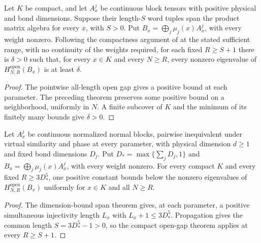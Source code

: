 \begin{lemma}
    \label{thm:compact_block_open_gap}
    \leanok
    Let $K$ be compact, and let $A_x^j$ be continuous block tensors with
    positive physical and bond dimensions. Suppose their length-$S$ word
    tuples span the product matrix algebra for every $x$, with $S>0$.
    Put $B_x=\bigoplus_j\mu_j(x)A_x^j$, with every weight nonzero.
    Following the compactness argument of \cite[Appendix~A]{Schuch2011Phases}
    at the stated sufficient range, with no continuity of the weights required,
    for each fixed $R\geq S+1$ there is $\delta>0$ such that, for every
    $x\in K$ and every $N\geq R$, every nonzero eigenvalue of
    $H^{\mathrm{open}}_{N,R}(B_x)$ is at least $\delta$.
\end{lemma}
\begin{proof}\leanok
    The pointwise all-length open gap gives a positive bound at each
    parameter. The preceding theorem preserves some positive bound on
    a neighborhood, uniformly in $N$. A finite subcover of $K$ and the
    minimum of its finitely many bounds give $\delta>0$.
\end{proof}

\begin{lemma}
    \label{thm:compact_normal_block_open_gap}
    \leanok
    Let $A_x^j$ be continuous normalized normal blocks, pairwise inequivalent
    under virtual similarity and phase at every parameter, with physical
    dimension $d\geq1$ and fixed bond dimensions $D_j$.
    Put $D_* =\max\{\sum_jD_j,1\}$ and
    $B_x=\bigoplus_j\mu_j(x)A_x^j$, with every weight nonzero.
    For every compact $K$ and every fixed $R\geq3D_*^5$, one positive
    constant bounds below the nonzero eigenvalues of
    $H^{\mathrm{open}}_{N,R}(B_x)$ uniformly for $x\in K$ and all $N\geq R$.
\end{lemma}
\begin{proof}\leanok
    The dimension-bound span theorem gives, at each parameter, a positive
    simultaneous injectivity length $L_x$ with $L_x+1\leq3D_*^5$.
    Propagation gives the common length $S=3D_*^5-1>0$, so the compact
    open-gap theorem applies at every $R\geq S+1$.
\end{proof}

